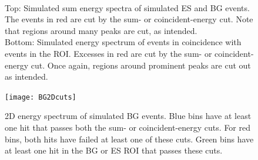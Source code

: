 \documentclass[/main.tex]{subfiles}
\begin{document}
\begin{figure}[!t]
  \centering
  \\
  \caption[Sum and coincident simulated energy spectra with cuts]{\label{fig:sumandcoinEcuts}
    Top: Simulated sum energy spectra of simulated ES and BG events. The events in red are cut by the sum- or coincident-energy cut. Note that regions around many peaks are cut, as intended.\\
    Bottom: Simulated energy spectrum of events in coincidence with events in the ROI. Excesses in red are cut by the sum- or coincident-energy cut. Once again, regions around prominent peaks are cut out as intended.
  }
\end{figure}

\begin{figure}[h]
  \centering
  \texttt{[image: BG2Dcuts]}
  \caption[2D energy spectrum of simulated BG events]{\label{fig:2Dcuts}
    2D energy spectrum of simulated BG events. Blue bins have at least one hit that passes both the sum- or coincident-energy cuts. For red bins, both hits have failed at least one of these cuts. Green bins have at least one hit in the BG or ES ROI that passes these cuts.
    }
\end{figure}
\end{document}

